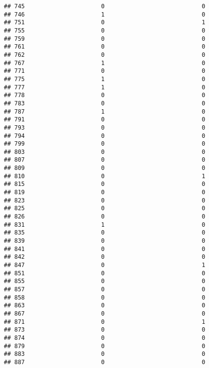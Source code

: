 \documentclass[
]{article}
\begin{document}
\begin{verbatim}
## 745                      0                            0
## 746                      1                            0
## 751                      0                            1
## 755                      0                            0
## 759                      0                            0
## 761                      0                            0
## 762                      0                            0
## 767                      1                            0
## 771                      0                            0
## 775                      1                            0
## 777                      1                            0
## 778                      0                            0
## 783                      0                            0
## 787                      1                            0
## 791                      0                            0
## 793                      0                            0
## 794                      0                            0
## 799                      0                            0
## 803                      0                            0
## 807                      0                            0
## 809                      0                            0
## 810                      0                            1
## 815                      0                            0
## 819                      0                            0
## 823                      0                            0
## 825                      0                            0
## 826                      0                            0
## 831                      1                            0
## 835                      0                            0
## 839                      0                            0
## 841                      0                            0
## 842                      0                            0
## 847                      0                            1
## 851                      0                            0
## 855                      0                            0
## 857                      0                            0
## 858                      0                            0
## 863                      0                            0
## 867                      0                            0
## 871                      0                            1
## 873                      0                            0
## 874                      0                            0
## 879                      0                            0
## 883                      0                            0
## 887                      0                            0

\end{verbatim}
\end{document}
